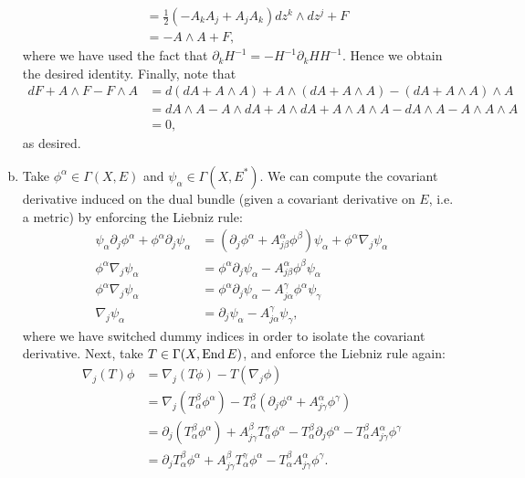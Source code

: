 \documentclass{../mathnotes}
\begin{document}
\begin{enumerate}[(a)]
\begin{align*}
            &=\frac{1}{2}\left(-A_kA_j+A_jA_k\right)dz^k\wedge dz^j+F\\
            &=-A\wedge A+F,
        \end{align*}
        where we have used the fact that $\partial_kH^{-1}=-H^{-1}\partial_kHH^{-1}$. Hence we obtain the desired identity. Finally, note that
        \begin{align*}
            dF+A\wedge F-F\wedge A&=d(dA+A\wedge A)+A\wedge (dA+A\wedge A)-(dA+A\wedge A)\wedge A\\
            &=dA\wedge A-A\wedge dA+A\wedge dA+A\wedge A\wedge A-dA\wedge A-A\wedge A\wedge A\\
            &=0,
        \end{align*}
        as desired.
    \item Take $\phi^\alpha\in\Gamma(X,E)$ and $\psi_\alpha\in\Gamma(X,E^*)$. We can compute the covariant derivative induced on the dual bundle (given a covariant
        derivative on $E$, i.e. a metric) by enforcing the Liebniz rule:
        \begin{align*}
            \psi_\alpha\partial_j\phi^\alpha+\phi^\alpha\partial_j\psi_\alpha&=(\partial_j\phi^\alpha+A_{j\beta}^\alpha\phi^\beta)\psi_\alpha+\phi^\alpha\nabla_j\psi_\alpha\\
            \phi^\alpha\nabla_j\psi_\alpha&=\phi^\alpha\partial_j\psi_\alpha-A_{j\beta}^\alpha\phi^\beta\psi_\alpha\\
            \phi^\alpha\nabla_j\psi_\alpha&=\phi^\alpha\partial_j\psi_\alpha-A_{j\alpha}^\gamma\phi^\alpha\psi_\gamma\\
            \nabla_j\psi_\alpha&=\partial_j\psi_\alpha-A_{j\alpha}^\gamma\psi_\gamma,
        \end{align*}
        where we have switched dummy indices in order to isolate the covariant derivative. Next, take $T\in\Gamma(X,\operatorname{End} E)$, and enforce the Liebniz rule again:
        \begin{align*}
            \nabla_j(T)\phi&=\nabla_j(T\phi)-T(\nabla_j\phi)\\
            &=\nabla_j(T_{\alpha}^\beta\phi^\alpha)-T^{\beta}_\alpha(\partial_j\phi^\alpha+A^{\alpha}_{j\gamma}\phi^\gamma)\\
            &=\partial_j(T_\alpha^\beta\phi^\alpha)+A_{j\gamma}^\beta T_\alpha^\gamma \phi^\alpha-T^\beta_\alpha\partial_j\phi^\alpha-T^\beta_\alpha A^\alpha_{j\gamma}\phi^\gamma\\
            &=\partial_jT^\beta_\alpha\phi^\alpha+A_{j\gamma}^\beta T_\alpha^\gamma \phi^\alpha-T^\beta_\alpha A^\alpha_{j\gamma}\phi^\gamma.

\end{align*}
\end{enumerate}
\end{document}
